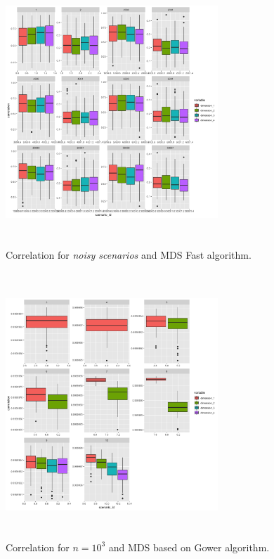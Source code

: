 \documentclass[11pt]{report}
\begin{document}
\begin{figure}[!ht]
\centering
    \includegraphics[width=8cm, height=10cm]{./images/fast_correlation_noise.png}
    \caption{Correlation for \textit{noisy scenarios} and MDS Fast algorithm.}
    \label{fast_correlation_noise}
\end{figure}

\begin{figure}[!ht]
\centering
    \includegraphics[width=8cm, height=10cm]{./images/gower_correlation_1000.png}
    \caption{Correlation for $n = 10^3$ and MDS based on Gower algorithm.}
    \label{gower_correlation_1000}
\end{figure}
\end{document}
